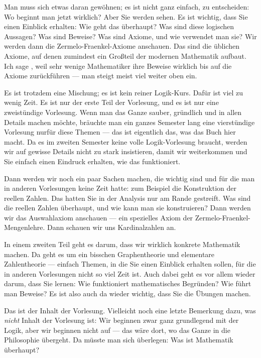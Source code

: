 \begin{spoken-clean}[00:21:15 - 00:23:45]
Man muss sich etwas daran gewöhnen; es ist nicht ganz einfach, zu entscheiden: Wo beginnt man jetzt wirklich? Aber Sie werden sehen. Es ist wichtig, dass Sie einen Einblick erhalten: Wie geht das überhaupt? Was sind diese logischen Aussagen? Was sind Beweise? Was sind Axiome, und wie verwendet man sie? Wir werden dann die Zermelo-Fraenkel-Axiome anschauen. Das sind die üblichen Axiome, auf denen  zumindest ein Großteil der modernen Mathematik aufbaut. Ich sage , weil sehr wenige Mathematiker ihre Beweise wirklich bis auf die Axiome zurückführen --- man steigt meist viel weiter oben ein.

Es ist trotzdem eine Mischung; es ist kein reiner Logik-Kurs. Dafür ist viel zu wenig Zeit. Es ist nur der erste Teil der Vorlesung, und es ist nur eine zweistündige Vorlesung. Wenn man das Ganze sauber, gründlich und in allen Details machen möchte, bräuchte man ein ganzes Semester lang eine vierstündige Vorlesung nurfür diese Themen --- das ist eigentlich das, was das Buch hier macht. Da es im zweiten Semester keine volle Logik-Vorlesung braucht, werden wir auf gewisse Details nicht zu stark insistieren, damit wir weiterkommen und Sie einfach einen Eindruck erhalten, wie das funktioniert.
\end{spoken-clean}

\begin{spoken-clean}[00:23:45 - 00:26:00]
Dann werden wir noch ein paar Sachen machen, die wichtig sind und für die man in anderen Vorlesungen keine Zeit hatte: zum Beispiel die Konstruktion der reellen Zahlen. Das hatten Sie in der Analysis nur am Rande gestreift. Was sind die reellen Zahlen überhaupt, und wie kann man sie konstruieren? Dann werden wir das Auswahlaxiom anschauen --- ein spezielles Axiom der Zermelo-Fraenkel-Mengenlehre. Dann schauen wir uns Kardinalzahlen an. 

In einem zweiten Teil geht es darum, dass wir wirklich konkrete Mathematik machen. Da geht es um ein bisschen Graphentheorie und elementare Zahlentheorie --- einfach Themen, in die Sie einen Einblick erhalten sollen, für die in anderen Vorlesungen nicht so viel Zeit ist. Auch dabei geht es vor allem wieder darum, dass Sie lernen: Wie funktioniert mathematisches Begründen? Wie führt man Beweise? Es ist also auch da wieder wichtig, dass Sie die Übungen machen.

Das ist der Inhalt der Vorlesung. Vielleicht noch eine letzte Bemerkung dazu, was \emph{nicht} Inhalt der Vorlesung ist: Wir beginnen zwar ganz grundlegend mit der Logik, aber wir beginnen nicht auf  --- das wäre dort, wo das Ganze in die Philosophie übergeht. Da müsste man sich überlegen: Was ist Mathematik überhaupt?
\end{spoken-clean}

